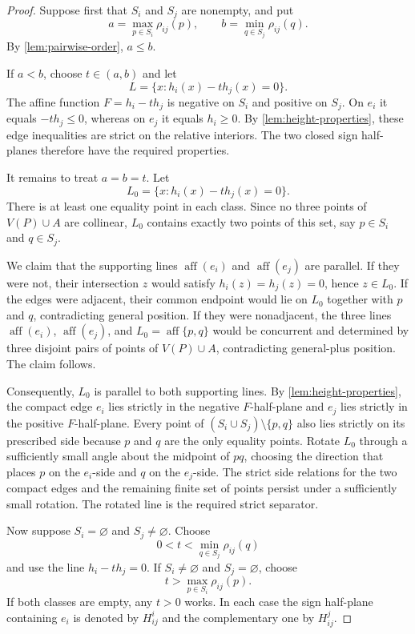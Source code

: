 \documentclass[final,5p,times,twocolumn]{elsarticle}
\theoremstyle{definition}
\theoremstyle{remark}
\newcommand{\aff}{\operatorname{aff}}
\newcommand{\height}{h}
\newcommand{\ratio}{\rho}
\begin{document}
\begin{proof}
Suppose first that $S_i$ and $S_j$ are nonempty, and put
\[
a=\max_{p\in S_i}\ratio_{ij}(p),
\qquad
b=\min_{q\in S_j}\ratio_{ij}(q).
\]
By \cref{lem:pairwise-order}, $a\leq b$.

If $a<b$, choose $t\in(a,b)$ and let
\[
L=\{x:\height_i(x)-t\height_j(x)=0\}.
\]
The affine function $F=\height_i-t\height_j$ is negative on $S_i$ and positive on $S_j$. On $e_i$ it equals $-t\height_j\leq0$, whereas on $e_j$ it equals $\height_i\geq0$. By \cref{lem:height-properties}, these edge inequalities are strict on the relative interiors. The two closed sign half-planes therefore have the required properties.

It remains to treat $a=b=t$. Let
\[
L_0=\{x:\height_i(x)-t\height_j(x)=0\}.
\]
There is at least one equality point in each class. Since no three points of $V(P)\cup A$ are collinear, $L_0$ contains exactly two points of this set, say $p\in S_i$ and $q\in S_j$.

We claim that the supporting lines $\aff(e_i)$ and $\aff(e_j)$ are parallel. If they were not, their intersection $z$ would satisfy $\height_i(z)=\height_j(z)=0$, hence $z\in L_0$. If the edges were adjacent, their common endpoint would lie on $L_0$ together with $p$ and $q$, contradicting general position. If they were nonadjacent, the three lines $\aff(e_i)$, $\aff(e_j)$, and $L_0=\aff\{p,q\}$ would be concurrent and determined by three disjoint pairs of points of $V(P)\cup A$, contradicting general-plus position. The claim follows.

Consequently, $L_0$ is parallel to both supporting lines. By \cref{lem:height-properties}, the compact edge $e_i$ lies strictly in the negative $F$-half-plane and $e_j$ lies strictly in the positive $F$-half-plane. Every point of $(S_i\cup S_j)\setminus\{p,q\}$ also lies strictly on its prescribed side because $p$ and $q$ are the only equality points. Rotate $L_0$ through a sufficiently small angle about the midpoint of $pq$, choosing the direction that places $p$ on the $e_i$-side and $q$ on the $e_j$-side. The strict side relations for the two compact edges and the remaining finite set of points persist under a sufficiently small rotation. The rotated line is the required strict separator.

Now suppose $S_i=\varnothing$ and $S_j\neq\varnothing$. Choose
\[
0<t<\min_{q\in S_j}\ratio_{ij}(q)
\]
and use the line $\height_i-t\height_j=0$. If $S_i\neq\varnothing$ and $S_j=\varnothing$, choose
\[
t>\max_{p\in S_i}\ratio_{ij}(p).
\]
If both classes are empty, any $t>0$ works. In each case the sign half-plane containing $e_i$ is denoted by $H_{ij}^{i}$ and the complementary one by $H_{ij}^{j}$.
\end{proof}
\end{document}
